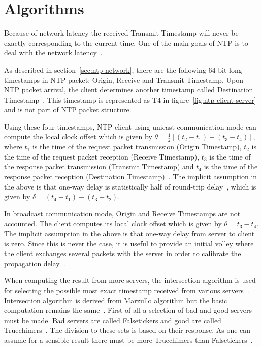 
\section{Algorithms}\label{sec:ntp-algorithms}
Because of network latency the received Transmit Timestamp will never be exactly
corresponding to the current time.
One of the main goals of NTP is to deal with the network latency~\cite{ntp-overview}.

As described in section~\ref{sec:ntp-network},
there are the following 64-bit long timestamps in NTP packet: Origin, Receive and Transmit Timestamp.
Upon NTP packet arrival, the client determines another timestamp called
Destination Timestamp~\cite{rfc5905}.
This timestamp is represented as T4 in figure~\ref{fig:ntp-client-server}
and is not part of NTP packet structure.

Using these four timestamps, NTP client using unicast communication mode can compute
the local clock offset which is given by $\theta = \frac{1}{2}[(t_2 - t_1) + (t_3 - t_4)]$,
where $t_1$ is the time of the request packet transmission (Origin Timestamp),
$t_2$ is the time of the request packet reception (Receive Timestamp),
$t_3$ is the time of the response packet transmission (Transmit Timestamp) and
$t_4$ is the time of the response packet reception (Destination Timestamp)~\cite{ntp-algor,rfc5905}.
The implicit assumption in the above is that one-way delay is
statistically half of round-trip delay~\cite{rfc5905},
which is given by $\delta = (t_4 - t_1) - (t_3 - t_2)$.

In broadcast communication mode, Origin and Receive Timestamps are not accounted.
The client computes its local clock offset which is given by $\theta = t_3 - t_4$.
The implicit assumption in the above is that one-way delay from server to client is zero.
Since this is never the case, it is useful to provide an
initial volley where the client exchanges several packets with the server in
order to calibrate the propagation delay~\cite{rfc5905}.

When computing the result from more servers, the intersection algorithm is used
for selecting the possible most exact timestamp received from various servers~\cite{ntp-improved-algor,rfc5905}.
Intersection algorithm is derived from Marzullo algorithm but the basic
computation remains the same~\cite{ntp-history}.
First of all a selection of bad and good servers must be made.
Bad servers are called Falsetickers and good are called Truechimers~\cite{rfc5905}.
The division to these sets is based on their response.
As one can assume for a sensible result there must be more Truechimers than Falsetickers~\cite{rfc5905}.

